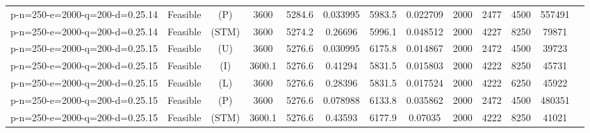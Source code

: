 \documentclass[landscape, a4paper]{article}
\newcommand{\STM}{\ensuremath{\mathrm{STM}}}
\newcommand{\Improved}{\ensuremath{\mathrm{I}}}
\newcommand{\Loose}{\ensuremath{\mathrm{L}}}
\newcommand{\Profit}{\ensuremath{\mathrm{P}}}
\newcommand{\Utility}{\ensuremath{\mathrm{U}}}
\begin{document}
\begin{center}
\begin{tabular}{lcccccccccccc}
p-n=250-e=2000-q=200-d=0.25.14 & Feasible & (\Profit) & 3600 & 5284.6 & 0.033995 & 5983.5 & 0.022709 & 2000 & 2477 & 4500 & 557491 & \\
p-n=250-e=2000-q=200-d=0.25.14 & Feasible & (\STM) & 3600 & 5274.2 & 0.26696 & 5996.1 & 0.048512 & 2000 & 4227 & 8250 & 79871 & \\
p-n=250-e=2000-q=200-d=0.25.15 & Feasible & (\Utility) & 3600 & 5276.6 & 0.030995 & 6175.8 & 0.014867 & 2000 & 2472 & 4500 & 39723 & \\
p-n=250-e=2000-q=200-d=0.25.15 & Feasible & (\Improved) & 3600.1 & 5276.6 & 0.41294 & 5831.5 & 0.015803 & 2000 & 4222 & 8250 & 45731 & \\
p-n=250-e=2000-q=200-d=0.25.15 & Feasible & (\Loose) & 3600 & 5276.6 & 0.28396 & 5831.5 & 0.017524 & 2000 & 4222 & 6250 & 45922 & \\
p-n=250-e=2000-q=200-d=0.25.15 & Feasible & (\Profit) & 3600 & 5276.6 & 0.078988 & 6133.8 & 0.035862 & 2000 & 2472 & 4500 & 480351 & \\
p-n=250-e=2000-q=200-d=0.25.15 & Feasible & (\STM) & 3600.1 & 5276.6 & 0.43593 & 6177.9 & 0.07035 & 2000 & 4222 & 8250 & 41021 & \\
\end{tabular}
\end{center}
\end{document}
